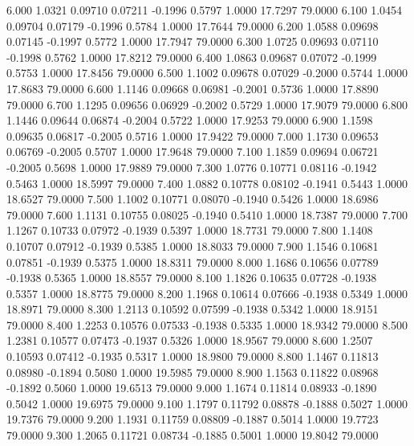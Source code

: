    6.000   1.0321   0.09710   0.07211  -0.1996   0.5797   1.0000  17.7297  79.0000
   6.100   1.0454   0.09704   0.07179  -0.1996   0.5784   1.0000  17.7644  79.0000
   6.200   1.0588   0.09698   0.07145  -0.1997   0.5772   1.0000  17.7947  79.0000
   6.300   1.0725   0.09693   0.07110  -0.1998   0.5762   1.0000  17.8212  79.0000
   6.400   1.0863   0.09687   0.07072  -0.1999   0.5753   1.0000  17.8456  79.0000
   6.500   1.1002   0.09678   0.07029  -0.2000   0.5744   1.0000  17.8683  79.0000
   6.600   1.1146   0.09668   0.06981  -0.2001   0.5736   1.0000  17.8890  79.0000
   6.700   1.1295   0.09656   0.06929  -0.2002   0.5729   1.0000  17.9079  79.0000
   6.800   1.1446   0.09644   0.06874  -0.2004   0.5722   1.0000  17.9253  79.0000
   6.900   1.1598   0.09635   0.06817  -0.2005   0.5716   1.0000  17.9422  79.0000
   7.000   1.1730   0.09653   0.06769  -0.2005   0.5707   1.0000  17.9648  79.0000
   7.100   1.1859   0.09694   0.06721  -0.2005   0.5698   1.0000  17.9889  79.0000
   7.300   1.0776   0.10771   0.08116  -0.1942   0.5463   1.0000  18.5997  79.0000
   7.400   1.0882   0.10778   0.08102  -0.1941   0.5443   1.0000  18.6527  79.0000
   7.500   1.1002   0.10771   0.08070  -0.1940   0.5426   1.0000  18.6986  79.0000
   7.600   1.1131   0.10755   0.08025  -0.1940   0.5410   1.0000  18.7387  79.0000
   7.700   1.1267   0.10733   0.07972  -0.1939   0.5397   1.0000  18.7731  79.0000
   7.800   1.1408   0.10707   0.07912  -0.1939   0.5385   1.0000  18.8033  79.0000
   7.900   1.1546   0.10681   0.07851  -0.1939   0.5375   1.0000  18.8311  79.0000
   8.000   1.1686   0.10656   0.07789  -0.1938   0.5365   1.0000  18.8557  79.0000
   8.100   1.1826   0.10635   0.07728  -0.1938   0.5357   1.0000  18.8775  79.0000
   8.200   1.1968   0.10614   0.07666  -0.1938   0.5349   1.0000  18.8971  79.0000
   8.300   1.2113   0.10592   0.07599  -0.1938   0.5342   1.0000  18.9151  79.0000
   8.400   1.2253   0.10576   0.07533  -0.1938   0.5335   1.0000  18.9342  79.0000
   8.500   1.2381   0.10577   0.07473  -0.1937   0.5326   1.0000  18.9567  79.0000
   8.600   1.2507   0.10593   0.07412  -0.1935   0.5317   1.0000  18.9800  79.0000
   8.800   1.1467   0.11813   0.08980  -0.1894   0.5080   1.0000  19.5985  79.0000
   8.900   1.1563   0.11822   0.08968  -0.1892   0.5060   1.0000  19.6513  79.0000
   9.000   1.1674   0.11814   0.08933  -0.1890   0.5042   1.0000  19.6975  79.0000
   9.100   1.1797   0.11792   0.08878  -0.1888   0.5027   1.0000  19.7376  79.0000
   9.200   1.1931   0.11759   0.08809  -0.1887   0.5014   1.0000  19.7723  79.0000
   9.300   1.2065   0.11721   0.08734  -0.1885   0.5001   1.0000  19.8042  79.0000
